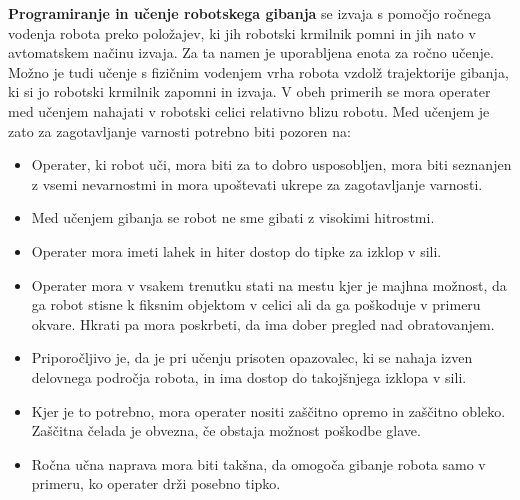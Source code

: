 \textbf{Programiranje in učenje robotskega gibanja} se izvaja s
pomočjo ročnega vodenja robota preko položajev, ki jih robotski
krmilnik pomni in jih nato v avtomatskem načinu izvaja. Za ta
namen je uporabljena enota za ročno učenje. Možno je tudi učenje s
fizičnim vodenjem vrha robota vzdolž trajektorije gibanja, ki si
jo robotski krmilnik zapomni in izvaja. V obeh primerih se mora
operater med učenjem nahajati v robotski celici relativno blizu
robotu. Med učenjem je zato za zagotavljanje varnosti potrebno
biti pozoren na:
\begin{itemize}
    \item \vspace*{-0.1cm} Operater, ki robot uči, mora biti za to
    dobro usposobljen, mora biti seznanjen z vsemi nevarnostmi in
    mora upoštevati ukrepe za zagotavljanje varnosti.

    \item \vspace*{-0.1cm} Med učenjem gibanja se robot ne sme
    gibati z visokimi hitrostmi.

    \item \vspace*{-0.1cm} Operater mora imeti lahek in hiter dostop do tipke za
    izklop v sili.

    \item \vspace*{-0.1cm} Operater mora v vsakem trenutku stati
    na mestu kjer je majhna možnost, da ga robot stisne k fiksnim objektom
    v celici ali da ga poškoduje v primeru okvare.
    Hkrati pa mora poskrbeti, da ima dober pregled nad obratovanjem.

    \item \vspace*{-0.1cm} Priporočljivo je, da je pri učenju
    prisoten opazovalec, ki se nahaja izven delovnega področja
    robota, in ima dostop do takojšnjega izklopa v sili.

    \item \vspace*{-0.1cm} Kjer je to potrebno, mora operater nositi
    zaščitno opremo in zaščitno obleko. Zaščitna čelada je
    obvezna, če obstaja možnost poškodbe glave.

    \item \vspace*{-0.1cm} Ročna učna naprava mora biti takšna, da omogoča gibanje robota samo v primeru, ko operater
    drži posebno tipko.
\end{itemize}



